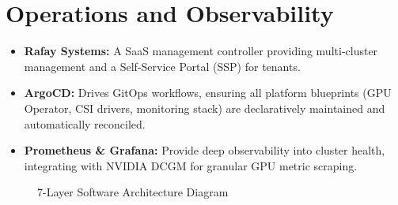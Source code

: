 \section{Operations and Observability}
\begin{itemize}
    \item \textbf{Rafay Systems:} A SaaS management controller providing multi-cluster management and a Self-Service Portal (SSP) for tenants.
    \item \textbf{ArgoCD:} Drives GitOps workflows, ensuring all platform blueprints (GPU Operator, CSI drivers, monitoring stack) are declaratively maintained and automatically reconciled.
    \item \textbf{Prometheus \& Grafana:} Provide deep observability into cluster health, integrating with NVIDIA DCGM for granular GPU metric scraping.
\end{itemize}

\begin{figure}[htbp]
    \centering
    \caption{7-Layer Software Architecture Diagram}
    \label{fig:software_diagram}
\end{figure}
